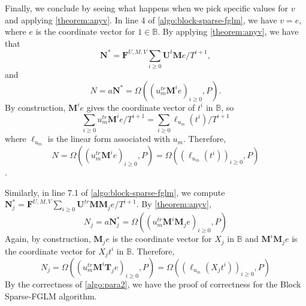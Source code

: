 \documentclass[12pt]{article}
\def\mF{\mathbf{F}}
\def\mM{\mathbf{M}}
\def\mN{\mathbf{N}}
\def\mT{\mathbf{T}}
\def\mU{\mathbf{U}}
\begin{document}
Finally, we conclude by seeing what happens
when we pick specific values for $v$ and applying \cref{theorem:anyv}.
In line 4 of \cref{algo:block-sparse-fglm}, we have $v = e$, 
where $e$ is the coordinate vector for $1 \in \mathbb{B}$.
By applying \cref{theorem:anyv}, we have that
$$\mN^* = \mF^{U,M,V}\sum_{i\ge0}\mU^t \mM e/T^{i+1},$$  and
$$N = a\mN^* = \Omega((u_m^{tr} \mM^i e)_{i\ge 0},P).$$
By construction,
$\mM^i e$ gives the coordinate vector of $t^i$ in $\mathbb{B}$, so
$$\sum_{i\ge 0} u_m^{tr} \mM^i e/T^{i+1} = \sum_{i\ge0} \ell_{u_m}(t^i)/T^{i+1}$$ 
where $\ell_{u_m}$ is the linear form associated with $u_m$. Therefore, 
$$N = \Omega((u_m^{tr} \mM^i e)_{i\ge 0},P) = \Omega( (\ell_{u_m}(t^i))_{i\ge 0},P)$$.

Similarly, in line 7.1 of \cref{algo:block-sparse-fglm}, we compute
$\mN^*_j = \mF^{U,M,V}\sum_{i\ge0} \mU^{tr} \mM \mM_j e / T^{i+1}$. By \cref{theorem:anyv},
$$N_j = a \mN^*_j = \Omega((u_m^{tr} \mM^i \mM_j e)_{i\ge 0},P) $$
Again, by construction, $\mM_j e$ is the coordinate vector for $X_j$ in 
$\mathbb{B}$ and $\mM^i \mM_j e$ is the coordinate vector for $X_jt^i$ in
$\mathbb{B}$. Therefore,
$$ N_j =  \Omega((u_m^{tr} \mM^i \mT_j e)_{i\ge 0},P) =
 \Omega( (\ell_{u_m}(X_jt^i))_{i\ge 0},P)$$
By the correctness of \cref{algo:para2}, we have the proof
of correctness for the Block Sparse-FGLM algorithm.

\newpage
\end{document}
